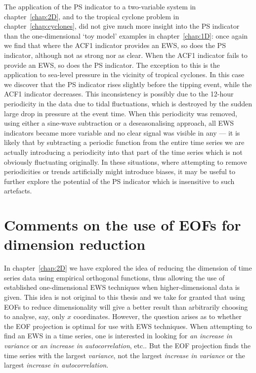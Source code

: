 The application of the PS indicator to a two-variable system in chapter~\ref{chap:2D}, and to the tropical cyclone problem in chapter~\ref{chap:cyclones}, did not give much more insight into the PS indicator than the one-dimensional `toy model' examples in chapter~\ref{chap:1D}: once again we find that where the ACF1 indicator provides an EWS, so does the PS indicator, although not as strong nor as clear. When the ACF1 indicator fails to provide an EWS, so does the PS indicator. The exception to this is the application to sea-level pressure in the vicinity of tropical cyclones. In this case we discover that the PS indicator rises slightly before the tipping event, while the ACF1 indicator decreases. This inconsistency is possibly due to the 12-hour periodicity in the data due to tidal fluctuations, which is destroyed by the sudden large drop in pressure at the event time. When this periodicity was removed, using either a sine-wave subtraction or a deseasonalising approach, all EWS indicators became more variable and no clear signal was visible in any — it is likely that by subtracting a periodic function from the entire time series we are actually introducing a periodicity into that part of the time series which is not obviously fluctuating originally. In these situations, where attempting to remove periodicities or trends artificially might introduce biases, it may be useful to further explore the potential of the PS indicator which is insensitive to such artefacts. 


\section{Comments on the use of EOFs for dimension reduction}

In chapter~\ref{chap:2D} we have explored the idea of reducing the dimension of time series data using empirical orthogonal functions, thus allowing the use of established one-dimensional EWS techniques when higher-dimensional data is given. This idea is not original to this thesis and we take for granted that using EOFs to reduce dimensionality will give a better result than arbitrarily choosing to analyse, say, only $x$ coordinates. However, the question arises as to whether the EOF projection is optimal for use with EWS techniques. When attempting to find an EWS in a time series, one is interested in looking for \emph{an increase in variance} or \emph{an increase in autocorrelation}, etc.. But the EOF projection finds the time series with the largest \emph{variance}, not the largest \emph{increase in variance} or the largest \emph{increase in autocorrelation}. 


